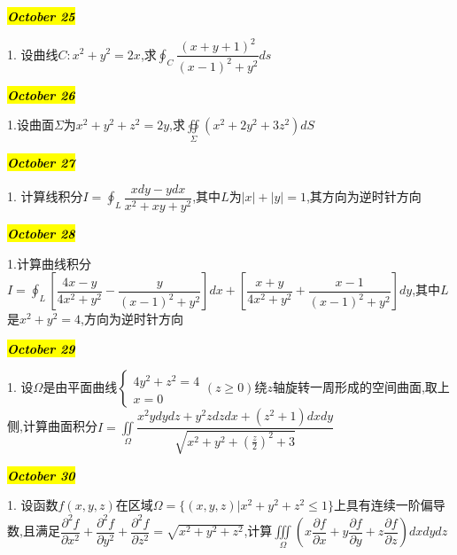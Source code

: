 \hl{\textbf{\textit{October 25}}}

1. 设曲线$C:x^{2}+y^{2}=2x$,求$\oint_{C}\dfrac{(x+y+1)^{2}}{(x-1)^{2}+y^{2}}ds$
\begin{solution}
	
\end{solution}

\hl{\textbf{\textit{October 26}}}

1.设曲面$\Sigma$为$x^{2}+y^{2}+z^{2}=2y$,求$\oiint\limits_{\Sigma}(x^{2}+2y^{2}+3z^{2})dS$
\begin{solution}
	
\end{solution}

\hl{\textbf{\textit{October 27}}}

1. 计算线积分$I=\oint_{L}\dfrac{xdy-ydx}{x^{2}+xy+y^{2}}$,其中$L$为$|x|+|y|=1$,其方向为逆时针方向
\begin{solution}
	
\end{solution}

\hl{\textbf{\textit{October 28}}}

1.计算曲线积分$I=\oint_{L}\left[\dfrac{4x-y}{4x^{2}+y^{2}}-\dfrac{y}{(x-1)^{2}+y^{2}} \right]dx+\left[\dfrac{x+y}{4x^{2}+y^{2}}+\dfrac{x-1}{(x-1)^{2}+y^{2}} \right]dy $,其中$L$是$x^{2}+y^{2}=4$,方向为逆时针方向
\begin{solution}
	
\end{solution}

\hl{\textbf{\textit{October 29}}}

1. 设$\Omega$是由平面曲线$\left\lbrace 
\begin{array}{l}
	4y^{2}+z^{2}=4\\
	x=0
\end{array}
\right.(z\geq 0)$绕$z$轴旋转一周形成的空间曲面,取上侧,计算曲面积分$I=\iint\limits_{\Omega}\dfrac{x^{2}ydydz+y^{2}zdzdx+(z^{2}+1)dxdy}{\sqrt{x^{2}+y^{2}+(\frac{z}{2})^{2}+3}}$
\begin{solution}
	
\end{solution}

\hl{\textbf{\textit{October 30}}}

1. 设函数$f(x,y,z)$在区域$\Omega=\{(x,y,z)|x^{2}+y^{2}+z^{2}\leq 1\}$上具有连续一阶偏导数,且满足$\dfrac{\partial^{2}f}{\partial x^{2}}+\dfrac{\partial^{2}f}{\partial y^{2}}+\dfrac{\partial^{2}f}{\partial z^{2}}=\sqrt{x^{2}+y^{2}+z^{2}}$,计算$\iiint\limits_{\Omega}(x\dfrac{\partial f}{\partial x}+y\dfrac{\partial f}{\partial y}+z\dfrac{\partial f}{\partial z})dxdydz$
\begin{solution}
	
\end{solution}

